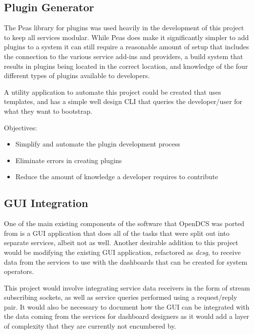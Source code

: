  \subsection{Plugin Generator}\label{sec:future-plugin-generator}

    The Peas library for plugins was used heavily in the development of this
    project to keep all services modular. While Peas does make it significantly
    simpler to add plugins to a system it can still require a reasonable amount
    of setup that includes the connection to the various service add-ins and
    providers, a build system that results in plugins being located in the
    correct location, and knowledge of the four different types of plugins
    available to developers.

    A utility application to automate this project could be created that uses
    templates, and has a simple well design CLI that queries the developer/user
    for what they want to bootstrap.

    Objectives:

    \begin{itemize}
      \item Simplify and automate the plugin development process
      \item Eliminate errors in creating plugins
      \item Reduce the amount of knowledge a developer requires to contribute
    \end{itemize}

  \subsection{GUI Integration}\label{sec:future-gui}

    One of the main existing components of the software that OpenDCS was ported
    from is a GUI application that does all of the tasks that were split out
    into separate services, albeit not as well. Another desirable addition to
    this project would be modifying the existing GUI application, refactored as
    \emph{dcsg}, to receive data from the services to use with the dashboards
    that can be created for system operators.

    This project would involve integrating service data receivers in the form
    of stream subscribing sockets, as well as service queries performed using
    a request/reply pair. It would also be necessary to document how the GUI
    can be integrated with the data coming from the services for dashboard
    designers as it would add a layer of complexity that they are currently
    not encumbered by.

